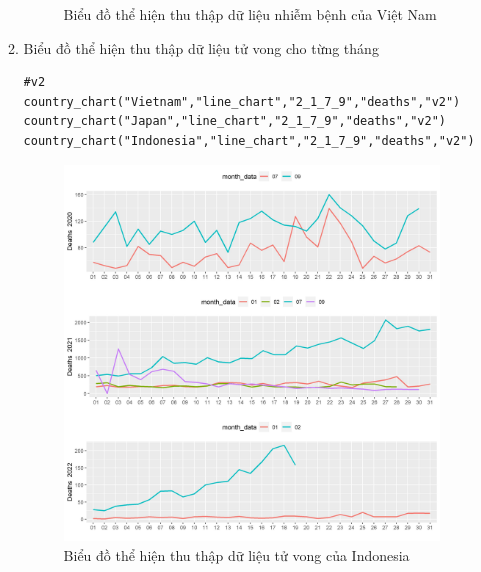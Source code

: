 \documentclass[a4paper]{article}
\theoremstyle{definition}
\begin{document}
\begin{enumerate}[i)]
\begin{enumerate}[1)]
\begin{figure}[htp]
		    \caption{Biểu đồ thể hiện thu thập dữ liệu nhiễm bệnh của Việt Nam}
		    \label{fig:my_label}
		\end{figure}
	\newpage
    \item Biểu đồ thể hiện thu thập dữ liệu tử vong cho từng tháng
    	\begin{lstlisting}[frame=single]  
#v2
country_chart("Vietnam","line_chart","2_1_7_9","deaths","v2")
country_chart("Japan","line_chart","2_1_7_9","deaths","v2")
country_chart("Indonesia","line_chart","2_1_7_9","deaths","v2")
		\end{lstlisting}	
        \begin{figure}[htp]
		    \centering
		    \includegraphics[scale = 0.7]{Images/V/v2 Indonesia .jpeg}
		    \caption{Biểu đồ thể hiện thu thập dữ liệu tử vong của Indonesia}
		    \label{fig:my_label}
		\end{figure}
		\begin{figure}[htp]
		    \centering

\end{figure}
\end{enumerate}
\end{enumerate}
\end{document}
